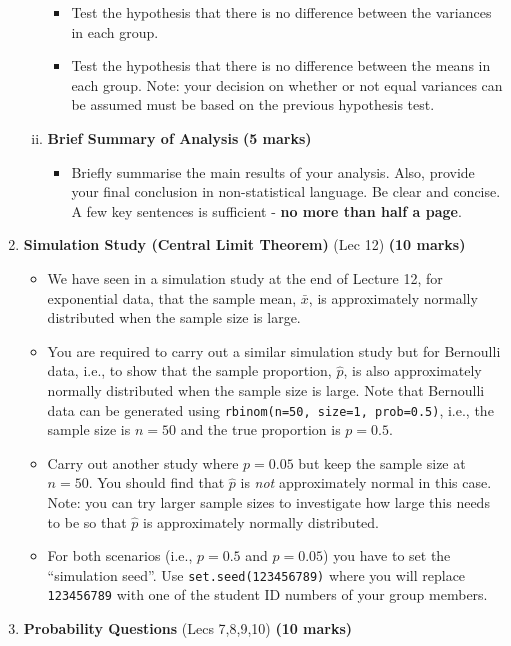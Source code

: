 \documentclass[12pt]{article}
\begin{document}
\begin{enumerate}[1)]
\begin{enumerate}[i)]
\begin{itemize}
\item Test the hypothesis that there is no difference between the variances in each group.
\item Test the hypothesis that there is no difference between the means in each group. Note: your decision on whether or not equal variances can be assumed must be based on the previous hypothesis test.
\end{itemize}
\item {\bf Brief Summary of Analysis} \hfill{\scriptsize \bf (5 marks)}
\begin{itemize}
\item Briefly summarise the main results of your analysis. Also, provide your final conclusion in non-statistical language. Be clear and concise. A few key sentences is sufficient - {\bf no more than half a page}.\\
\end{itemize}
\end{enumerate}
\item {\bf Simulation Study (Central Limit Theorem)} (Lec 12) \hfill{\scriptsize \bf (10 marks)}
\begin{itemize}
\item We have seen in a simulation study at the end of Lecture 12, for exponential data, that the sample mean, $\bar x$, is approximately normally distributed when the sample size is large.
\item You are required to carry out a similar simulation study but for Bernoulli data, i.e., to show that the sample proportion, $\hat p$, is also approximately normally distributed when the sample size is large. Note that Bernoulli data can be generated using \texttt{rbinom(n=50, size=1, prob=0.5)}, i.e., the sample size is $n=50$ and the true proportion is $p=0.5$.
\item Carry out another study where $p = 0.05$ but keep the sample size at $n=50$. You should find that $\hat p$ is \emph{not} approximately normal in this case. Note: you can try larger sample sizes to investigate how large this needs to be so that $\hat p$ is approximately normally distributed.
\item For both scenarios (i.e., $p=0.5$ and $p=0.05$) you have to set the ``simulation seed''. Use \texttt{set.seed(123456789)} where you will replace \texttt{123456789} with one of the student ID numbers of your group members.\\
\end{itemize}
\item {\bf Probability Questions} (Lecs 7,8,9,10)  \hfill{\scriptsize \bf (10 marks)}\\

\end{enumerate}
\end{document}
